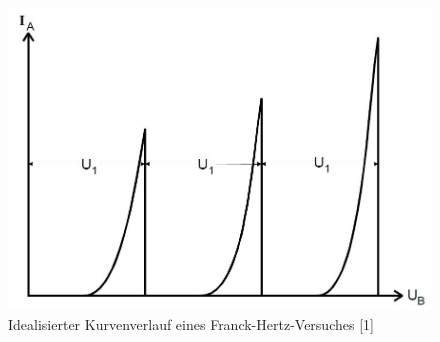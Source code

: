 	\begin{figure}[h]
		\begin{center}
		\includegraphics[scale=0.3]{picfhkurvet.jpg}
		\caption{Idealisierter Kurvenverlauf eines Franck-Hertz-Versuches [1]}
		\label{picfhkurvet}
		\end{center}	
	\end{figure}